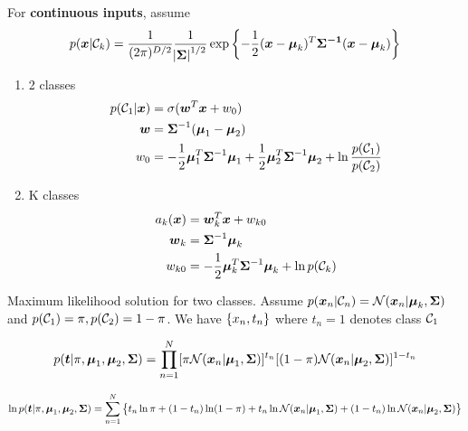 \documentclass[11pt]{article}
\begin{document}
For \textbf{continuous inputs}, assume
\begin{equation*}
p(\boldsymbol{x}|\mathcal{C}_k)=\frac{1}{(2\pi)^{D/2}}\frac{1}
{\abs{\boldsymbol{\Sigma}}^{1/2}}\exp\left\{-\frac{1}{2}(\boldsymbol{x}-\boldsymbol{\mu}_k)^T
\boldsymbol{\Sigma^{-1}}(\boldsymbol{x}-\boldsymbol{\mu}_k)\right\}
\end{equation*}
\begin{enumerate}
\item 2 classes
\begin{align*}
p(\mathcal{C}_1|\boldsymbol{x})&=\sigma(\boldsymbol{w}^T\boldsymbol{x}+w_0)\\
\boldsymbol{w}&=\boldsymbol{\Sigma}^{-1}(\boldsymbol{\mu}_1-\boldsymbol{\mu}_2)\\
w_0&=-\frac{1}{2}\boldsymbol{\mu}_1^T\boldsymbol{\Sigma}^{-1}\boldsymbol{\mu}_1+
\frac{1}{2}\boldsymbol{\mu}_2^T\boldsymbol{\Sigma}^{-1}\boldsymbol{\mu}_2+\ln\frac{p(\mathcal{C}_1)}
{p(\mathcal{C}_2)}\\
\end{align*}
\item K classes
\begin{align*}
a_k(\boldsymbol{x})&=\boldsymbol{w}_k^T\boldsymbol{x}+w_{k0}\\
\boldsymbol{w}_k&=\boldsymbol{\Sigma}^{-1}\boldsymbol{\mu}_k\\
w_{k0}&=-\frac{1}{2}\boldsymbol{\mu}_k^T\boldsymbol{\Sigma}^{-1}\boldsymbol{\mu}_k+\ln p(\mathcal{C}_k)
\end{align*}
\end{enumerate}


Maximum likelihood solution for two classes. Assume 
\(p(\boldsymbol{x}_n|\mathcal{C}_n)=\mathcal{N}(\boldsymbol{x}_n|\boldsymbol{\mu}_k,\boldsymbol{\Sigma})\) and \(p(\mathcal{C}_1)=\pi,
   p(\mathcal{C}_2)=1-\pi\). We have \(\left\{ x_n,t_n\right\}\) where \(t_n=1\) denotes class
\(\mathcal{C}_1\)

\begin{equation*}
p(\boldsymbol{t}|\pi,\boldsymbol{\mu}_1,\boldsymbol{\mu}_2,\boldsymbol{\Sigma})=\displaystyle\prod_{n=1}^N
[\pi\mathcal{N}(\boldsymbol{x}_n|\boldsymbol{\mu}_1,\boldsymbol{\Sigma})]^{t_n}[(1-\pi)\mathcal{N}(\boldsymbol{x}_n|\boldsymbol{\mu}_2,\boldsymbol{\Sigma})]^{1-t_n}
\end{equation*}

\begin{equation*}
 \ln p(\boldsymbol{t}|\pi,\boldsymbol{\mu}_1,\boldsymbol{\mu}_2,\boldsymbol{\Sigma})=\displaystyle\sum_{n=1}^N\left\{
 t_n\ln \pi+(1-t_n)\ln(1-\pi)+t_n\ln\mathcal{N}(\boldsymbol{x}_n|\boldsymbol{\mu}_1,\boldsymbol{\Sigma})+
 (1-t_n)\ln\mathcal{N}(\boldsymbol{x}_n|\boldsymbol{\mu}_2,\boldsymbol{\Sigma})
 \right\}
\end{equation*}
\end{document}
